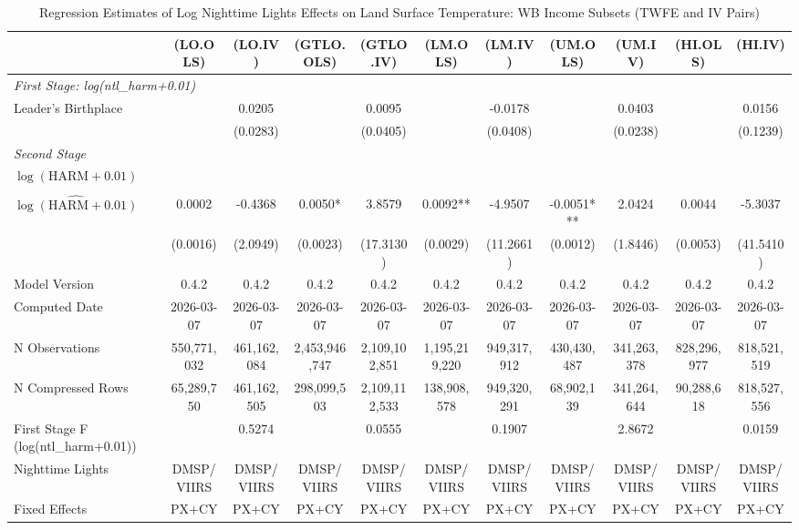 \begin{table}[htbp]
\centering
\tiny
\caption{Regression Estimates of Log Nighttime Lights Effects on Land Surface Temperature: WB Income Subsets (TWFE and IV Pairs)}
\begin{tabular}{lcccccccccc}
\toprule
 & (LO.OLS) & (LO.IV) & (GTLO.OLS) & (GTLO.IV) & (LM.OLS) & (LM.IV) & (UM.OLS) & (UM.IV) & (HI.OLS) & (HI.IV) \\
\midrule
\midrule
\multicolumn{11}{l}{\textit{First Stage: log(ntl\_harm+0.01)}} \\
  Leader's Birthplace &  & 0.0205 &  & 0.0095 &  & -0.0178 &  & 0.0403 &  & 0.0156 \\
 &  & (0.0283) &  & (0.0405) &  & (0.0408) &  & (0.0238) &  & (0.1239) \\
\midrule
\multicolumn{11}{l}{\textit{Second Stage}} \\
$\log(\text{HARM} + 0.01)$ &  &  &  &  &  &  &  &  &  &  \\
 &  &  &  &  &  &  &  &  &  &  \\
$\hat{\log(\text{HARM} + 0.01)}$ & 0.0002 & -0.4368 & 0.0050* & 3.8579 & 0.0092** & -4.9507 & -0.0051*** & 2.0424 & 0.0044 & -5.3037 \\
 & (0.0016) & (2.0949) & (0.0023) & (17.3130) & (0.0029) & (11.2661) & (0.0012) & (1.8446) & (0.0053) & (41.5410) \\
\midrule
Model Version & 0.4.2 & 0.4.2 & 0.4.2 & 0.4.2 & 0.4.2 & 0.4.2 & 0.4.2 & 0.4.2 & 0.4.2 & 0.4.2 \\
Computed Date & 2026-03-07 & 2026-03-07 & 2026-03-07 & 2026-03-07 & 2026-03-07 & 2026-03-07 & 2026-03-07 & 2026-03-07 & 2026-03-07 & 2026-03-07 \\
N Observations & 550,771,032 & 461,162,084 & 2,453,946,747 & 2,109,102,851 & 1,195,219,220 & 949,317,912 & 430,430,487 & 341,263,378 & 828,296,977 & 818,521,519 \\
N Compressed Rows & 65,289,750 & 461,162,505 & 298,099,503 & 2,109,112,533 & 138,908,578 & 949,320,291 & 68,902,139 & 341,264,644 & 90,288,618 & 818,527,556 \\
First Stage F (log(ntl\_harm+0.01)) &  & 0.5274 &  & 0.0555 &  & 0.1907 &  & 2.8672 &  & 0.0159 \\
\midrule
Nighttime Lights & DMSP/VIIRS & DMSP/VIIRS & DMSP/VIIRS & DMSP/VIIRS & DMSP/VIIRS & DMSP/VIIRS & DMSP/VIIRS & DMSP/VIIRS & DMSP/VIIRS & DMSP/VIIRS \\
Fixed Effects & PX+CY & PX+CY & PX+CY & PX+CY & PX+CY & PX+CY & PX+CY & PX+CY & PX+CY & PX+CY \\

\end{tabular}
\end{table}
